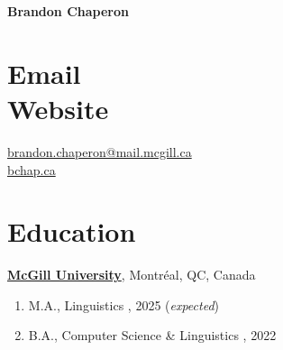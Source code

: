 \documentclass[margin,line]{resume}
\begin{document}
{\Large \textbf{Brandon Chaperon}}
\begin{resume}


	\section{\mysidestyle Email \vspace{0.3em}\\Website}
	\href{mailto:brandon.chaperon@mail.mcgill.ca}{%
		brandon.chaperon@mail.mcgill.ca
	}\vspace{0.3em}\\
	\href{https://bchaper0n.github.io/}{bchap.ca}



	\section{\mysidestyle Education}
	\href{https://www.mcgill.ca/}{\textbf{McGill University}}, Montréal, QC, Canada
	\begin{enumerate}[-, leftmargin=1em, topsep=4pt]
		\item[] M.A., %
		      Linguistics%
		      , 2025 (\textit{expected})
		\item[] B.A., %
		      Computer Science %
		      \& %
		      Linguistics%
		      , 2022
	\end{enumerate}


\end{resume}
\end{document}
